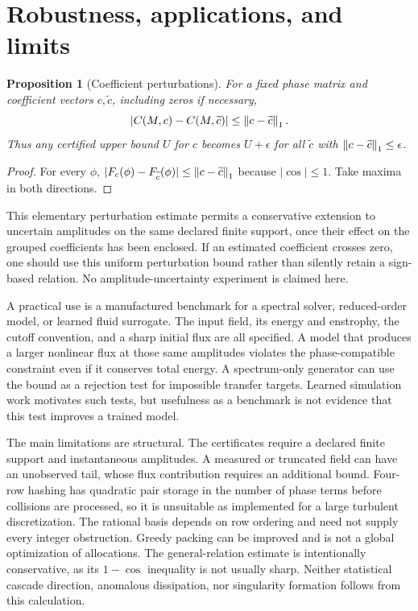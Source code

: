 \documentclass[11pt]{article}
\newtheorem{proposition}[theorem]{Proposition}
\begin{document}
\section{Robustness, applications, and limits}\label{sec:limits}
\begin{proposition}[Coefficient perturbations]\label{prop:lipschitz}
For a fixed phase matrix and coefficient vectors $c,\widetilde c$, including zeros if necessary,
\begin{equation}
 |C(M,c)-C(M,\widetilde c)|\le\left\lVert c-\widetilde c\right\rVert_1.
\end{equation}
Thus any certified upper bound $U$ for $c$ becomes $U+\epsilon$ for all $\widetilde c$ with $\left\lVert c-\widetilde c\right\rVert_1\le\epsilon$.
\end{proposition}
\begin{proof}
For every $\phi$, $|F_c(\phi)-F_{\widetilde c}(\phi)|\le\left\lVert c-\widetilde c\right\rVert_1$ because $|\cos|\le1$. Take maxima in both directions.
\end{proof}
This elementary perturbation estimate permits a conservative extension to uncertain amplitudes on the same declared finite support, once their effect on the grouped coefficients has been enclosed. If an estimated coefficient crosses zero, one should use this uniform perturbation bound rather than silently retain a sign-based relation. No amplitude-uncertainty experiment is claimed here.

A practical use is a manufactured benchmark for a spectral solver, reduced-order model, or learned fluid surrogate. The input field, its energy and enstrophy, the cutoff convention, and a sharp initial flux are all specified. A model that produces a larger nonlinear flux at those same amplitudes violates the phase-compatible constraint even if it conserves total energy. A spectrum-only generator can use the bound as a rejection test for impossible transfer targets. Learned simulation work \cite{kochkov} motivates such tests, but usefulness as a benchmark is not evidence that this test improves a trained model.

The main limitations are structural. The certificates require a declared finite support and instantaneous amplitudes. A measured or truncated field can have an unobserved tail, whose flux contribution requires an additional bound. Four-row hashing has quadratic pair storage in the number of phase terms before collisions are processed, so it is unsuitable as implemented for a large turbulent discretization. The rational basis depends on row ordering and need not supply every integer obstruction. Greedy packing can be improved and is not a global optimization of allocations. The general-relation estimate is intentionally conservative, as its $1-\cos$ inequality is not usually sharp. Neither statistical cascade direction, anomalous dissipation, nor singularity formation follows from this calculation.
\end{document}
